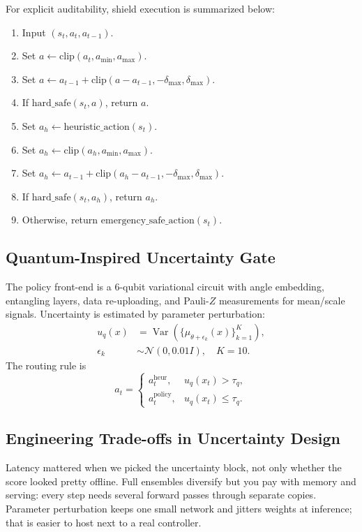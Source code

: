 For explicit auditability, shield execution is summarized below:
\begin{enumerate}
    \item Input $(s_t, a_t, a_{t-1})$.
    \item Set $a\leftarrow\mathrm{clip}(a_t,a_{\min},a_{\max})$.
    \item Set $a\leftarrow a_{t-1}+\mathrm{clip}(a-a_{t-1},-\delta_{\max},\delta_{\max})$.
    \item If $\mathrm{hard\_safe}(s_t,a)$, return $a$.
    \item Set $a_h\leftarrow\mathrm{heuristic\_action}(s_t)$.
    \item Set $a_h\leftarrow\mathrm{clip}(a_h,a_{\min},a_{\max})$.
    \item Set $a_h\leftarrow a_{t-1}+\mathrm{clip}(a_h-a_{t-1},-\delta_{\max},\delta_{\max})$.
    \item If $\mathrm{hard\_safe}(s_t,a_h)$, return $a_h$.
    \item Otherwise, return $\mathrm{emergency\_safe\_action}(s_t)$.
\end{enumerate}

\subsection{Quantum-Inspired Uncertainty Gate}

The policy front-end is a 6-qubit variational circuit with angle embedding, entangling layers, data re-uploading, and Pauli-$Z$ measurements for mean/scale signals. Uncertainty is estimated by parameter perturbation:
\[
\begin{aligned}
u_q(x) &= \operatorname{Var}\left(\{\mu_{\theta+\epsilon_k}(x)\}_{k=1}^{K}\right), \\
\epsilon_k &\sim \mathcal{N}(0,0.01I),\quad K=10.
\end{aligned}
\]
The routing rule is
\[
a_t=
\begin{cases}
a_t^{\mathrm{heur}}, & u_q(x_t)>\tau_q,\\
a_t^{\mathrm{policy}}, & u_q(x_t)\le\tau_q.
\end{cases}
\]

\subsection{Engineering Trade-offs in Uncertainty Design}

Latency mattered when we picked the uncertainty block, not only whether the score looked pretty offline. Full ensembles diversify but you pay with memory and serving: every step needs several forward passes through separate copies. Parameter perturbation keeps one small network and jitters weights at inference; that is easier to host next to a real controller.

